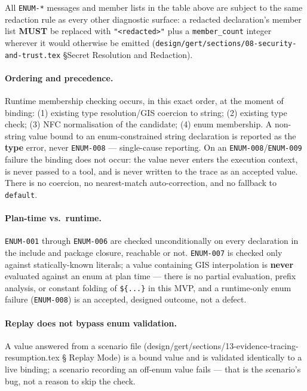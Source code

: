 All \texttt{ENUM-*} messages and member lists in the table above are subject
to the same redaction rule as every other diagnostic surface: a redacted
declaration's member list \textbf{MUST} be replaced with
\texttt{"<redacted>"} plus a \texttt{member\_count} integer wherever it
would otherwise be emitted
(\texttt{design/gert/sections/08-security-and-trust.tex} \S Secret
Resolution and Redaction).

\paragraph{Ordering and precedence.} Runtime membership checking occurs, in
this exact order, at the moment of binding: (1) existing type
resolution/GIS coercion to string; (2) existing type check; (3) NFC
normalisation of the candidate; (4) enum membership. A non-string value
bound to an enum-constrained string declaration is reported as the
\textbf{type} error, never \texttt{ENUM-008} --- single-cause reporting. On
an \texttt{ENUM-008}/\texttt{ENUM-009} failure the binding does not occur:
the value never enters the execution context, is never passed to a tool,
and is never written to the trace as an accepted value. There is no
coercion, no nearest-match auto-correction, and no fallback to
\texttt{default}.

\paragraph{Plan-time vs.\ runtime.} \texttt{ENUM-001} through
\texttt{ENUM-006} are checked unconditionally on every declaration in the
include and package closure, reachable or not. \texttt{ENUM-007} is checked
only against statically-known literals; a value containing GIS
interpolation is \textbf{never} evaluated against an enum at plan
time --- there is no partial evaluation, prefix analysis, or constant
folding of \texttt{\$\{...\}} in this MVP, and a runtime-only enum failure
(\texttt{ENUM-008}) is an accepted, designed outcome, not a defect.

\paragraph{Replay does not bypass enum validation.} A value answered from a
scenario file (design/gert/sections/13-evidence-tracing-resumption.tex \S
Replay Mode) is a bound value and is validated identically to a live
binding; a scenario recording an off-enum value fails --- that is the
scenario's bug, not a reason to skip the check.


